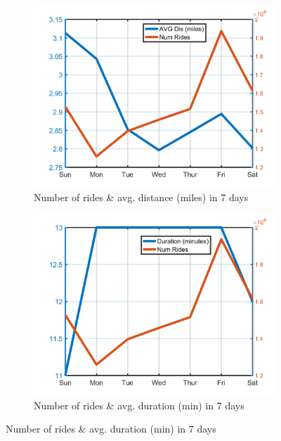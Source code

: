 \documentclass{article}
\begin{document}
\begin{figure}[H]
\begin{subfigure}{.5\linewidth}
  \centering
  \includegraphics[width=.8\linewidth]{numride_dow}
  \caption{Number of rides \& avg. distance (miles) in 7 days}
  \label{fig:sub3}
\end{subfigure}%
\begin{subfigure}{.5\linewidth}
  \centering
  \includegraphics[width=.8\linewidth]{numride_dow_dur}
  \caption{Number of rides \& avg. duration (min) in 7 days}
  \label{fig:sub4}
\end{subfigure}


\end{figure}
\end{document}
